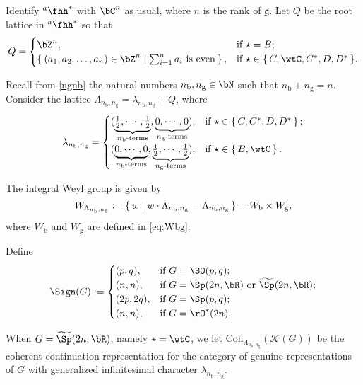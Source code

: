 \documentclass[12pt,a4paper]{amsart}
\def\subset{\subseteq}
\newcommand{\CK}{{\mathcal {K}}}
\newcommand{\g}{\mathfrak g}
\numberwithin{equation}{section}
\theoremstyle{remark}
\def\half{{\tfrac{1}{2}}}
\def\hha{{}^a\fhh}
\def\nbb{n_{\mathrm b}}
\def\ngg{n_{\mathrm g}}
\def\Coh{\mathrm{Coh}}
\begin{document}
Identify $\hha^{*}$ with $\bC^{n}$ as usual, where $n$ is the rank of $\g$.  Let $Q$
be the root lattice in $\hha^{*}$ so that
\[
  Q = \begin{cases}
    \bZ^{n}, & \text{if  $\star = B$};\\
    \Set{(a_{1}, a_2, \dots, a_n)\in \bZ^{n}|\sum_{i=1}^{n}a_{i} \text{ is even}},
    & \text{if  $\star \in \set{C,\wtC,C^{*},D,D^{*}}$}.\\
  \end{cases}
\]

Recall from \eqref{ngnb} the natural numbers  $n_{\mathrm b}, n_{\mathrm g}\in \bN$ such that $n_{\mathrm b}+n_{\mathrm g}=n$. 
Consider the lattice $\Lambda_{n_{\mathrm b},n_{\mathrm g}}=\lambda_{n_{\mathrm b},n_{\mathrm g}}+Q$, where
\[
  \lambda_{n_{\mathrm b},n_{\mathrm g}} =
  \begin{cases}
    (\underbrace{\half, \cdots, \half}_{n_{\mathrm b}\text{-terms}}, \underbrace{0, \cdots, 0}_{n_{\mathrm g}\text{-terms}}),  & \text{if
    } \star\in \set{C,C^{*}, D,D^{*}};\\%
    (\underbrace{0, \cdots, 0}_{n_{\mathrm b}\text{-terms}}, \underbrace{\half, \cdots, \half}_{n_{\mathrm g}\text{-terms}}),  & \text{if 
    } \star\in \set{B,\wtC}. %
  \end{cases}
\]

The integral Weyl group is given by
\[
  W_{\Lambda_{\nbb,\ngg}}:= \set{w| w\cdot \Lambda_{\nbb,\ngg} = \Lambda_{\nbb,\ngg}} = W_{\mathrm b}\times W_{\mathrm g},
\]
where $W_{\mathrm b}$ and $W_{\mathrm g}$ are defined in \eqref{eq:Wbg}.


Define
\[
  \Sign(G):= \begin{cases}
    (p,q), & \text{if } G = \SO(p,q);\\
    (n,n), & \text{if } G = \Sp(2n,\bR) \text{ or } \widetilde \Sp(2n,\bR);\\
    (2p,2q), & \text{if } G = \Sp(p,q); \\
    (n,n), & \text{if } G = \rO^{*}(2n). \\
  \end{cases}
\]

When $G=\widetilde \Sp(2n,\bR)$, namely $\star = \wtC$, we let $\Coh_{\Lambda_{n_{\mathrm b},n_{\mathrm g}}}(\CK(G))$ be the coherent continuation representation for the category of genuine representations of $G$ with generalized infinitesimal character $\lambda_{n_{\mathrm b},n_{\mathrm g}}$.
\end{document}
